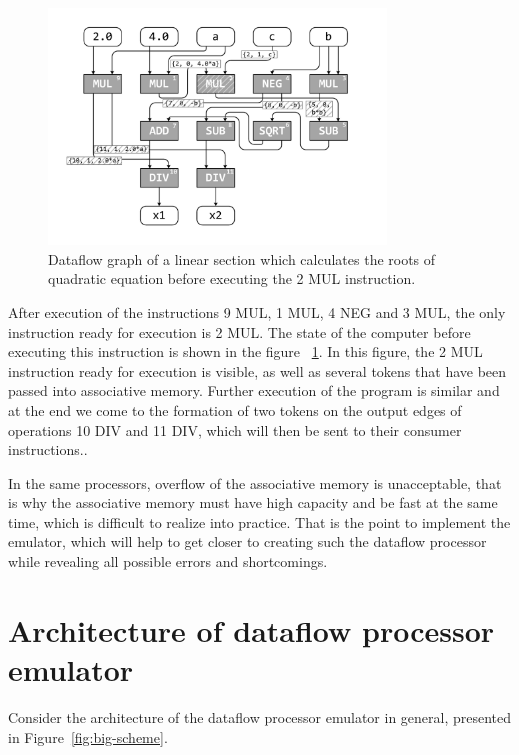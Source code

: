 \documentclass[
11pt,%
tightenlines,%
twoside,%
onecolumn,%
nofloats,%
nobibnotes,%
nofootinbib,%
superscriptaddress,%
noshowpacs,%
centertags]%
{revtex4}
\begin{document}
\begin{figure}[h]
\setcaptionmargin{5mm}
\onelinecaptionsfalse %
\includegraphics[width=0.80\textwidth]{pics/dataflow2.pdf}
\caption{Dataflow graph of a linear section which calculates the roots of quadratic equation before executing the 2 MUL instruction.}\label{fig:dataflow2}
\end{figure}

After execution of the instructions 9 MUL, 1 MUL, 4 NEG and 3 MUL, the only instruction ready for execution is 2 MUL.
The state of the computer before executing this instruction is shown in the figure ~\ref{fig:dataflow2}.
In this figure, the 2 MUL instruction ready for execution is visible, as well as several tokens that have been passed into associative memory.
Further execution of the program is similar and at the end we come to the formation of two tokens on the output edges of operations 10 DIV and 11 DIV, which will then be sent to their consumer instructions..

In the same processors, overflow of the associative memory is unacceptable, that is why the associative memory must have high capacity and be fast at the same time, which is difficult to realize into practice.
That is the point to implement the emulator, which will help to get closer to creating such the dataflow processor while revealing all possible errors and shortcomings.

\section{Architecture of dataflow processor emulator}

Consider the architecture of the dataflow processor emulator in general, presented in Figure~\ref{fig:big-scheme}.
\end{document}
